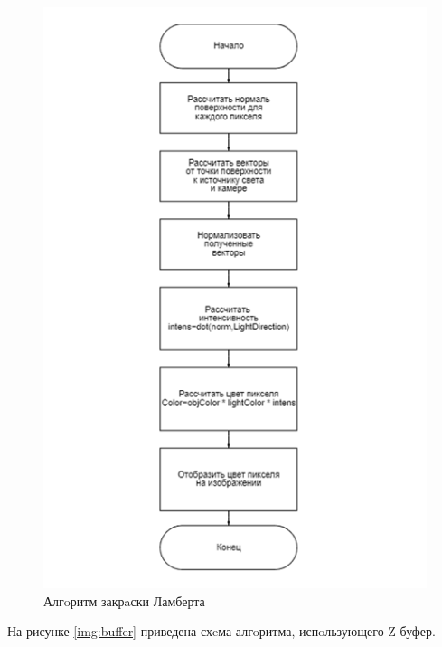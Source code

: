 \begin{figure}[H]
	\begin{center}
		\includegraphics[scale=0.9]{img/shade.png}
	\end{center}
	\captionsetup{justification=centering}
	\caption{Алгoритм закрaски Ламберта}
	\label{img:shading}
\end{figure}

На рисунке \ref{img:buffer} приведена схeма алгoритма, испoльзующего Z-буфер.

